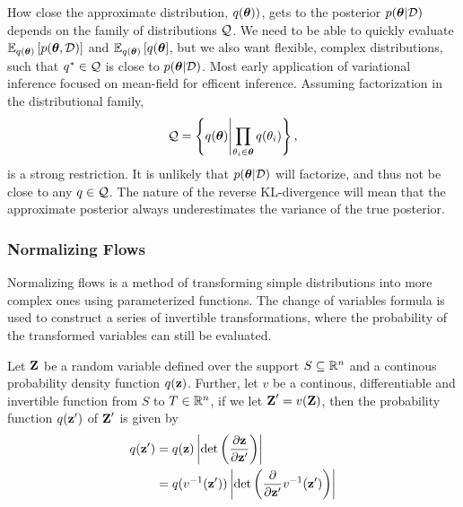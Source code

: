 \documentclass[twoside]{article}
\begin{document}
How close the approximate distribution, \(q(\boldsymbol \theta))\), gets to the posterior
\(p(\boldsymbol \theta \vert \mathcal{D})\) depends on the family of distributions \(\mathcal{Q}\).
We need to be able to quickly evaluate \(\mathbb{E}_{q(\boldsymbol \theta)} \left[ p(\boldsymbol \theta, \mathcal{D}) \right]\) and
\(\mathbb{E}_{q(\boldsymbol \theta)} \left[ q(\boldsymbol \theta \right]\), but we also want flexible, complex distributions,
such that \(q^* \in \mathcal{Q}\) is close to \(p(\boldsymbol \theta \vert \mathcal{D})\). Most
early application of variational inference focused on mean-field for efficent
inference. Assuming factorization in the distributional family,
\begin{equation}
  \mathcal{Q} =
  \left\{ q(\boldsymbol \theta) \middle\vert \prod_{\theta_i \in \boldsymbol \theta}{q(\theta_i)} \right\},
\end{equation}
is a strong restriction. It is unlikely that \(p(\boldsymbol \theta \vert \mathcal{D})\) will
factorize, and thus not be close to any \(q \in \mathcal{Q}\). The nature of the
reverse KL-divergence will mean that the approximate posterior always
underestimates the variance of the true posterior.

\subsubsection{Normalizing Flows}
Normalizing flows is a method of transforming simple distributions into more
complex ones using parameterized functions. The change of variables formula is
used to construct a series of invertible transformations, where the probability
of the transformed variables can still be evaluated.

Let \(\textbf{Z}\) be a random variable defined over the support \(S \subseteq \mathbb{R}^n\)
and a continous probability density function \(q(\textbf{z})\). Further, let \(v\) be
a continous, differentiable and invertible function from \(S\) to
\(T \in \mathbb{R}^n\), if we let \(\textbf{Z}^\prime = v(\textbf{Z})\), then the probability
function \(q(\textbf{z}^\prime)\) of \(\textbf{Z}^\prime\) is given by
\begin{align}
  q(\textbf{z}^\prime) & = q(\textbf{z}) \left\lvert \det \left( \frac{\partial \textbf{z}}{
  \partial \textbf{z}^\prime} \right) \right\rvert \nonumber                                       \\
                 & = q(v^{-1}(\textbf{z}^\prime)) \left\lvert \det \left( \frac{\partial}{\partial
    \textbf{z}^\prime} v^{-1}(\textbf{z}^\prime) \right) \right\rvert
  \label{eq:change_var_form1}
\end{align}
\end{document}
